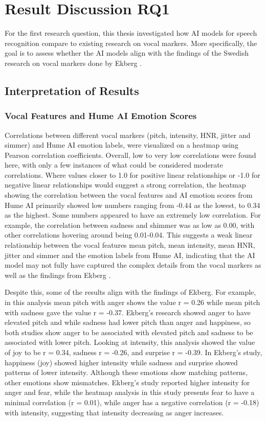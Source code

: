 \section{Result Discussion RQ1}
For the first research question, this thesis investigated how AI models for speech recognition compare to existing research on vocal markers. More specifically, the goal is to assess whether the AI models align with the findings of the Swedish research on vocal markers done by Ekberg \autocite{Ekberg2023}.
\subsection{Interpretation of Results}
\subsubsection{Vocal Features and Hume AI Emotion Scores}
Correlations between different vocal markers (pitch, intensity, HNR, jitter and simmer) and Hume AI emotion labels, were visualized on a heatmap using Pearson correlation coefficients. Overall, low to very low correlations were found here, with only a few instances of what could be considered moderate correlations.  
Where values closer to 1.0 for positive linear relationships or -1.0 for negative linear relationships would suggest a strong correlation, the heatmap showing the correlation between the vocal features and AI emotion scores from Hume AI primarily showed low numbers ranging from -0.44 as the lowest, to 0.34 as the highest. Some numbers appeared to have an extremely low correlation. For example, the correlation between sadness and shimmer was as low as 0.00, with other correlations hovering around being 0.01-0.04.
This suggests a weak linear relationship between the vocal features mean pitch, mean intensity, mean HNR, jitter and simmer and the emotion labels from Hume AI, indicating that the AI model may not fully have captured the complex details from the vocal markers as well as the findings from Ekberg \autocite{Ekberg2023}.

Despite this, some of the results align with the findings of Ekberg. 
For example, in this analysis mean pitch with anger shows the value r = 0.26 while mean pitch with sadness gave the value r = -0.37. Ekberg’s research showed anger to have elevated pitch and while sadness had lower pitch than anger and happiness, so both studies show anger to be associated with elevated pitch and sadness to be associated with lower pitch.
Looking at intensity, this analysis showed the value of joy to be r = 0.34, sadness r = -0.26, and surprise r = -0.39. In Ekberg’s study, happiness (joy) showed higher intensity while sadness and surprise showed patterns of lower intensity. Although these emotions show matching patterns, other emotions show mismatches. Ekberg’s study reported higher intensity for anger and fear, while the heatmap analysis in this study presents fear to have a minimal correlation (r = 0.01), while anger has a negative correlation (r = -0.18) with intensity, suggesting that intensity decreasing as anger increases.

